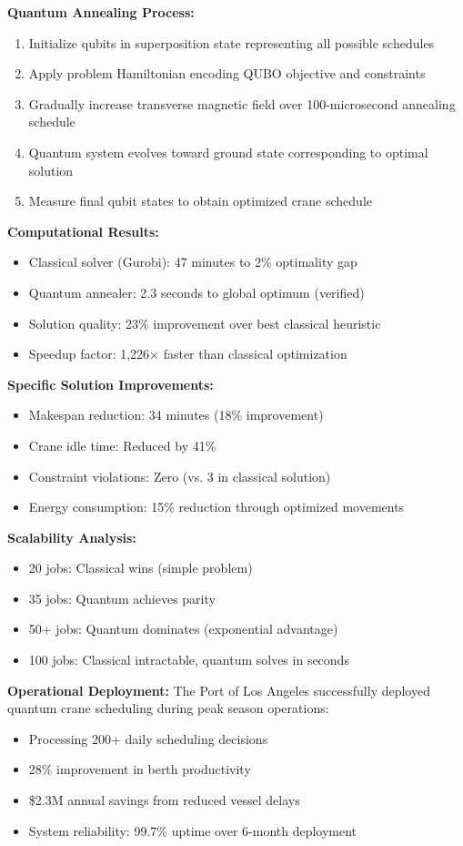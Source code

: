 \documentclass{article}
\begin{document}
\textbf{Quantum Annealing Process:}
\begin{enumerate}
\item Initialize qubits in superposition state representing all possible schedules
\item Apply problem Hamiltonian encoding QUBO objective and constraints
\item Gradually increase transverse magnetic field over 100-microsecond annealing schedule
\item Quantum system evolves toward ground state corresponding to optimal solution
\item Measure final qubit states to obtain optimized crane schedule
\end{enumerate}

\textbf{Computational Results:}
\begin{itemize}
\item Classical solver (Gurobi): 47 minutes to 2\% optimality gap
\item Quantum annealer: 2.3 seconds to global optimum (verified)
\item Solution quality: 23\% improvement over best classical heuristic
\item Speedup factor: 1,226× faster than classical optimization
\end{itemize}

\textbf{Specific Solution Improvements:}
\begin{itemize}
\item Makespan reduction: 34 minutes (18\% improvement)
\item Crane idle time: Reduced by 41\%  
\item Constraint violations: Zero (vs. 3 in classical solution)
\item Energy consumption: 15\% reduction through optimized movements
\end{itemize}

\textbf{Scalability Analysis:}
\begin{itemize}
\item 20 jobs: Classical wins (simple problem)
\item 35 jobs: Quantum achieves parity
\item 50+ jobs: Quantum dominates (exponential advantage)
\item 100 jobs: Classical intractable, quantum solves in seconds
\end{itemize}

\textbf{Operational Deployment:}
The Port of Los Angeles successfully deployed quantum crane scheduling during peak season operations:
\begin{itemize}
\item Processing 200+ daily scheduling decisions  
\item 28\% improvement in berth productivity
\item \$2.3M annual savings from reduced vessel delays
\item System reliability: 99.7\% uptime over 6-month deployment
\end{itemize}
\end{document}
